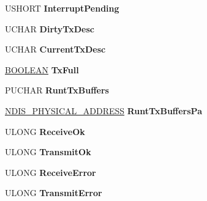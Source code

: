 \begin{DoxyCompactItemize}
U\+S\+H\+O\+RT {\bfseries Interrupt\+Pending}
\item 
\mbox{\label{struct___r_t_l___a_d_a_p_t_e_r_a849ae91c6ca6c3c8b472fa0b566cca8e}} 
U\+C\+H\+AR {\bfseries Dirty\+Tx\+Desc}
\item 
\mbox{\label{struct___r_t_l___a_d_a_p_t_e_r_a7d621fb478a3ae0d7060379bc6e2db05}} 
U\+C\+H\+AR {\bfseries Current\+Tx\+Desc}
\item 
\mbox{\label{struct___r_t_l___a_d_a_p_t_e_r_acc52d59c8cdcf2fe11cedfe3d7afed53}} 
\hyperlink{_processor_bind_8h_a112e3146cb38b6ee95e64d85842e380a}{B\+O\+O\+L\+E\+AN} {\bfseries Tx\+Full}
\item 
\mbox{\label{struct___r_t_l___a_d_a_p_t_e_r_ad4954e6c1ac89e335ba5d6c1633dd035}} 
P\+U\+C\+H\+AR {\bfseries Runt\+Tx\+Buffers}
\item 
\mbox{\label{struct___r_t_l___a_d_a_p_t_e_r_aa05cce0c124f8023758d3d19c6c1f520}} 
\hyperlink{union___l_a_r_g_e___i_n_t_e_g_e_r}{N\+D\+I\+S\+\_\+\+P\+H\+Y\+S\+I\+C\+A\+L\+\_\+\+A\+D\+D\+R\+E\+SS} {\bfseries Runt\+Tx\+Buffers\+Pa}
\item 
\mbox{\label{struct___r_t_l___a_d_a_p_t_e_r_a446cb510d496fc3fc51f6653b90f523d}} 
U\+L\+O\+NG {\bfseries Receive\+Ok}
\item 
\mbox{\label{struct___r_t_l___a_d_a_p_t_e_r_aee9ed1077ff69dfe14e37e1445c5173e}} 
U\+L\+O\+NG {\bfseries Transmit\+Ok}
\item 
\mbox{\label{struct___r_t_l___a_d_a_p_t_e_r_a44e129a2c7c2be63a51ecb286f528fa0}} 
U\+L\+O\+NG {\bfseries Receive\+Error}
\item 
\mbox{\label{struct___r_t_l___a_d_a_p_t_e_r_a91939b6d5bc1bbc96ea584597f6904f4}} 
U\+L\+O\+NG {\bfseries Transmit\+Error}
\item 
\mbox{\label{struct___r_t_l___a_d_a_p_t_e_r_a54a961e6ae7a4e9b3b0d31da5121f13a}} 

\end{DoxyCompactItemize}
